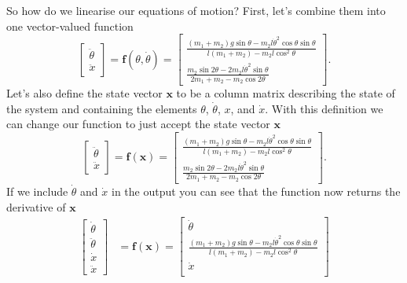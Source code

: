 \documentclass{article}
\renewcommand{\vec}[1]{\boldsymbol{\mathbf{#1}}}
\begin{document}
So how do we linearise our equations of motion? First, let's combine them into one vector-valued function \[\begin{bmatrix}
    \ddot{\theta} \\
    \ddot{x}
  \end{bmatrix} = \vec{f}(\theta, \dot{\theta}) = \begin{bmatrix}
    \frac{(m_1 + m_2) g \sin \theta - m_2 l \dot{\theta}^2 \cos \theta \sin \theta}{l (m_1 + m_2) - m_2 l \cos^2 \theta} \\
    \frac{m_2 \sin 2 \theta - 2 m_2 l \dot{\theta}^2 \sin \theta}{2 m_1 + m_2 - m_2 \cos 2 \theta}
  \end{bmatrix}.\] Let's also define the state vector $\vec{x}$ to be a column matrix describing the state of the system and containing the elements $\theta$, $\dot{\theta}$, $x$, and $\dot{x}$. With this definition we can change our function to just accept the state vector $\vec{x}$ \[\begin{bmatrix}
    \ddot{\theta} \\
    \ddot{x}
  \end{bmatrix} = \vec{f}(\vec{x}) = \begin{bmatrix}
    \frac{(m_1 + m_2) g \sin \theta - m_2 l \dot{\theta}^2 \cos \theta \sin \theta}{l (m_1 + m_2) - m_2 l \cos^2 \theta} \\
    \frac{m_2 \sin 2 \theta - 2 m_2 l \dot{\theta}^2 \sin \theta}{2 m_1 + m_2 - m_2 \cos 2 \theta}
  \end{bmatrix}.\] If we include $\dot{\theta}$ and $\dot{x}$ in the output you can see that the function now returns the derivative of $\vec{x}$ \begin{align*}
  \begin{bmatrix}
    \dot{\theta}  \\
    \ddot{\theta} \\
    \dot{x}       \\
    \ddot{x}
  \end{bmatrix} & = \vec{f}(\vec{x}) = \begin{bmatrix}
                                         \dot{\theta}                                                                                                         \\
                                         \frac{(m_1 + m_2) g \sin \theta - m_2 l \dot{\theta}^2 \cos \theta \sin \theta}{l (m_1 + m_2) - m_2 l \cos^2 \theta} \\
                                         \dot{x}                                                                                                              \\

\end{bmatrix}
\end{align*}
\end{document}
